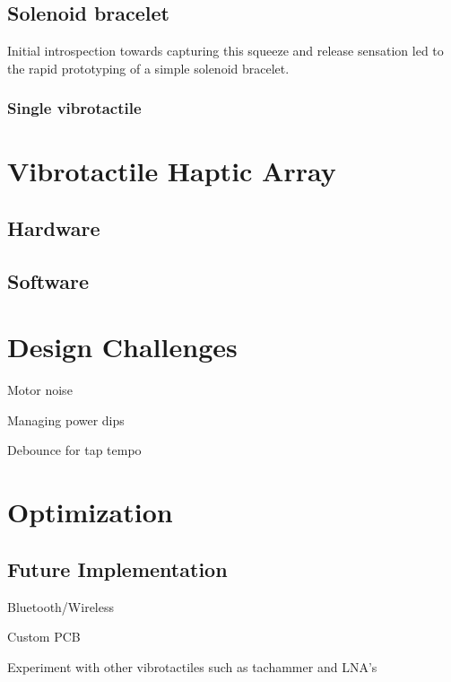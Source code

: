 \subsection{Solenoid bracelet}
Initial introspection towards capturing this squeeze and release sensation led to the rapid prototyping of a simple solenoid bracelet. 

\subsubsection{Single vibrotactile}

\section{Vibrotactile Haptic Array}

\subsection{Hardware}


\subsection{Software}

\section{Design Challenges}

Motor noise

Managing power dips



Debounce for tap tempo

\section{Optimization}

\subsection{Future Implementation}

Bluetooth/Wireless

Custom PCB

Experiment with other vibrotactiles such as tachammer and LNA's
